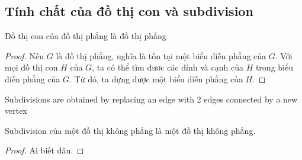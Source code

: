 \subsection{Tính chất của đồ thị con và subdivision}

\begin{corollary}
    Đồ thị con của đồ thị phẳng là đồ thị phẳng
\end{corollary}

\begin{proof}
    Nếu $G$ là đồ thị phẳng, nghĩa là tồn tại một biểu diễn phẳng của $G$. Với mọi đồ thị con
    $H$ của $G$, ta có thể tìm đươc các đỉnh và cạnh của $H$ trong biểu diễn phẳng của $G$.
    Từ đó, ta dựng được một biểu diễn phẳng của $H$.
\end{proof}

\begin{definition}
    Subdivisions are obtained by replacing an edge with 2 edges connected by a new vertex
\end{definition}
\begin{center}
    \hspace{2cm}
\end{center}

\begin{corollary}
    Subdivision của một đồ thị không phẳng là một đồ thị không phẳng.\end{corollary}
\begin{proof}
    Ai biết đâu.
\end{proof}
